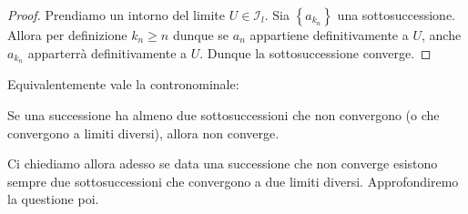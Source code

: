 \documentclass[11pt]{scrartcl}
\begin{document}
	\begin{proof}
		Prendiamo un intorno del limite $U\in\mathcal{I}_l$. Sia $\left\{a_{k_n}\right\}$ una sottosuccessione. Allora per definizione $k_n\ge n$ dunque se $a_n$ appartiene definitivamente a $U$, anche $a_{k_n}$ apparterrà definitivamente a $U$. Dunque la sottosuccessione converge.
	\end{proof}
	Equivalentemente vale la contronominale:
	\begin{proposition}
		Se una successione ha almeno due sottosuccessioni che non convergono (o che convergono a limiti diversi), allora non converge.
	\end{proposition}
	Ci chiediamo allora adesso se data una successione che non converge esistono sempre due sottosuccessioni che convergono a due limiti diversi. Approfondiremo la questione poi.
\end{document}
